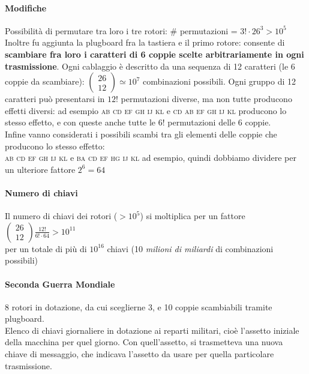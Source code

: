 \documentclass[10pt]{book}
\begin{document}
\paragraph{Modifiche} Possibilità di permutare tra loro i tre rotori: \# permutazioni = $3!\cdot26^3 > 10^5$\\
Inoltre fu aggiunta la plugboard fra la tastiera e il primo rotore: consente di \textbf{scambiare fra loro i caratteri di 6 coppie scelte arbitrariamente in ogni trasmissione}. Ogni cablaggio è descritto da una sequenza di 12 caratteri (le 6 coppie da scambiare): $\left(\begin{array}{c}26\\12\end{array}\right)\simeq 10^7$ combinazioni possibili. Ogni gruppo di 12 caratteri può presentarsi in $12!$ permutazioni diverse, ma non tutte producono effetti diversi: ad esempio \textsc{ab cd ef gh ij kl} e \textsc{cd ab ef gh ij kl} producono lo stesso effetto, e con queste anche tutte le $6!$ permutazioni delle 6 coppie.\\
Infine vanno considerati i possibili scambi tra gli elementi delle coppie che producono lo stesso effetto:\\\textsc{ab cd ef gh ij kl} e \textsc{ba cd ef hg ij kl} ad esempio, quindi dobbiamo dividere per un ulteriore fattore $2^6 = 64$
\paragraph{Numero di chiavi} Il numero di chiavi dei rotori ($> 10^5$) si moltiplica per un fattore $\left(\begin{array}{c} 26\\12\end{array}\right)\frac{12!}{6!\cdot64} > 10^{11}$\\
per un totale di più di $10^{16}$ chiavi (10 \textit{milioni di miliardi} di combinazioni possibili)
\paragraph{Seconda Guerra Mondiale} 8 rotori in dotazione, da cui sceglierne 3, e 10 coppie scambiabili tramite plugboard.\\
Elenco di chiavi giornaliere in dotazione ai reparti militari, cioè l'assetto iniziale della macchina per quel giorno. Con quell'assetto, si trasmetteva una nuova chiave di messaggio, che indicava l'assetto da usare per quella particolare trasmissione.
\end{document}
